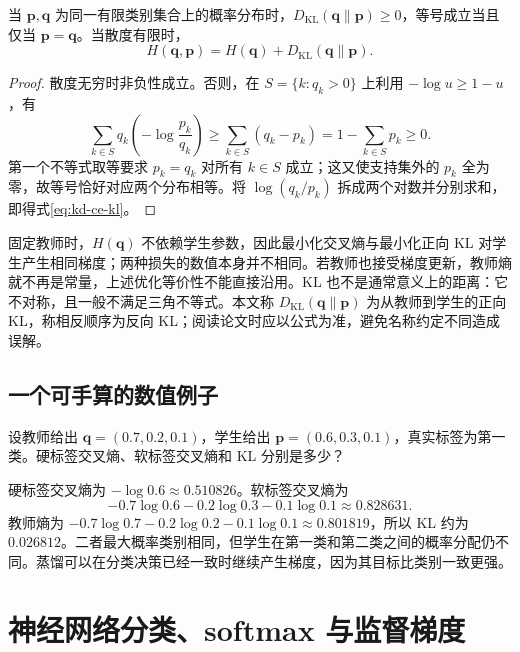 \documentclass[UTF8,12pt,a4paper,fontset=fandol]{ctexart}
\begin{document}
\begin{proposition}[非负性和交叉熵分解]
当 $\mathbf p,\mathbf q$ 为同一有限类别集合上的概率分布时，$D_{\mathrm{KL}}(\mathbf q\|\mathbf p)\geq0$，等号成立当且仅当 $\mathbf p=\mathbf q$。当散度有限时，
\begin{equation}
 H(\mathbf q,\mathbf p)=H(\mathbf q)+D_{\mathrm{KL}}(\mathbf q\|\mathbf p).
 \label{eq:kd-ce-kl}
\end{equation}
\end{proposition}
\begin{proof}
散度无穷时非负性成立。否则，在 $S=\{k:q_k>0\}$ 上利用 $-\log u\geq1-u$，有
\[
 \sum_{k\in S}q_k\left(-\log\frac{p_k}{q_k}\right)
 \geq\sum_{k\in S}(q_k-p_k)
 =1-\sum_{k\in S}p_k\geq0.
\]
第一个不等式取等要求 $p_k=q_k$ 对所有 $k\in S$ 成立；这又使支持集外的 $p_k$ 全为零，故等号恰好对应两个分布相等。将 $\log(q_k/p_k)$ 拆成两个对数并分别求和，即得式\eqref{eq:kd-ce-kl}。
\end{proof}

固定教师时，$H(\mathbf q)$ 不依赖学生参数，因此最小化交叉熵与最小化正向 KL 对学生产生相同梯度；两种损失的数值本身并不相同。若教师也接受梯度更新，教师熵就不再是常量，上述优化等价性不能直接沿用。KL 也不是通常意义上的距离：它不对称，且一般不满足三角不等式。本文称 $D_{\mathrm{KL}}(\mathbf q\|\mathbf p)$ 为从教师到学生的正向 KL，称相反顺序为反向 KL；阅读论文时应以公式为准，避免名称约定不同造成误解。

\subsection{一个可手算的数值例子}
\begin{example}[同一正确率下的软分布差异]
设教师给出 $\mathbf q=(0.7,0.2,0.1)$，学生给出 $\mathbf p=(0.6,0.3,0.1)$，真实标签为第一类。硬标签交叉熵、软标签交叉熵和 KL 分别是多少？
\end{example}
\begin{solve}
硬标签交叉熵为 $-\log0.6\approx0.510826$。软标签交叉熵为
\[
 -0.7\log0.6-0.2\log0.3-0.1\log0.1\approx0.828631.
\]
教师熵为 $-0.7\log0.7-0.2\log0.2-0.1\log0.1\approx0.801819$，所以 KL 约为 $0.026812$。二者最大概率类别相同，但学生在第一类和第二类之间的概率分配仍不同。蒸馏可以在分类决策已经一致时继续产生梯度，因为其目标比类别一致更强。
\end{solve}

\section{神经网络分类、softmax 与监督梯度}
\label{sec:kd-softmax}
\end{document}
